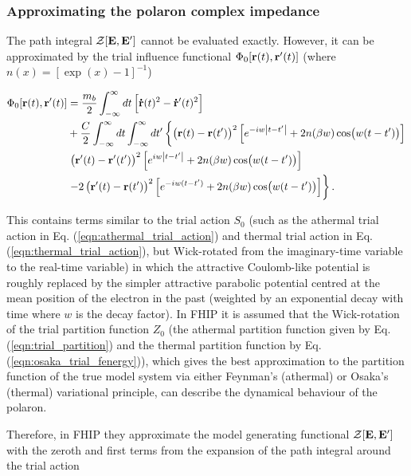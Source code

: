 \subsubsection{Approximating the polaron complex impedance}

The path integral $\mathcal{Z}[\vb{E}, \vb{E'}]$ cannot be evaluated exactly. However, it can be approximated by the trial influence functional $\Phi_0[\vb{r}(t), \vb{r'}(t)]$ (where $n(x) = [\exp(x) - 1]^{-1}$)

\begin{equation}
    \begin{aligned}
    \Phi_0[\vb{r}(t), \vb{r'}(t)] &= \frac{m_b}{2} \int^{\infty}_{-\infty} dt  \left[ \vb{\dot{r}}(t)^2 - \vb{\dot{r}'}(t)^2 \right] \\
    &+ \frac{C}{2} \int^{\infty}_{-\infty} dt \int^{\infty}_{-\infty} dt' \left\{  \left(\vb{r}(t) - \vb{r}(t')\right)^2\left[e^{-iw\abs{t-t'}} + 2n(\beta w) \cos(w(t-t')) \right] \right. \\
    &\left. \left(\vb{r'}(t) - \vb{r'}(t')\right)^2\left[e^{iw\abs{t-t'}} + 2n(\beta w) \cos(w(t-t')) \right]  \right. \\
    &\left. - 2 \left(\vb{r'}(t) - \vb{r}(t')\right)^2\left[e^{-iw(t-t')} + 2n(\beta w) \cos(w(t-t')) \right] \right\}.
    \end{aligned}
\end{equation}

This contains terms similar to the trial action $S_0$ (such as the athermal trial action in Eq. (\ref{eqn:athermal_trial_action}) and thermal trial action in Eq. (\ref{eqn:thermal_trial_action}), but Wick-rotated from the imaginary-time variable to the real-time variable) in which the attractive Coulomb-like potential is roughly replaced by the simpler attractive parabolic potential centred at the mean position of the electron in the past (weighted by an exponential decay with time where $w$ is the decay factor). In FHIP it is assumed that the Wick-rotation of the trial partition function $Z_0$ (the athermal partition function given by Eq. (\ref{eqn:trial_partition}) and the thermal partition function by Eq. (\ref{eqn:osaka_trial_fenergy})), which gives the best approximation to the partition function of the true model system via either Feynman's (athermal) or Osaka's (thermal) variational principle, can describe the dynamical behaviour of the polaron. 

Therefore, in FHIP they approximate the model generating functional $\mathcal{Z[\vb{E}, \vb{E'}]}$ with the zeroth and first terms from the expansion of the path integral around the trial action

